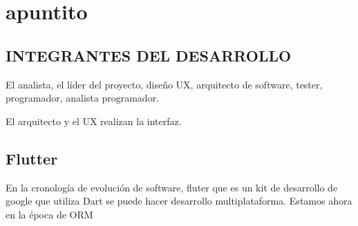 \chapter{apuntito}
\section{INTEGRANTES DEL DESARROLLO}
El analista, el líder del proyecto, diseño UX, arquitecto de software, tester, programador, analista programador.

El arquitecto y el UX realizan la interfaz. 
\section{Flutter}
En la cronología de evolución de software, fluter que es un kit de desarrollo de google que utiliza Dart se puede hacer desarrollo multiplataforma. Estamos ahora en la época de ORM

